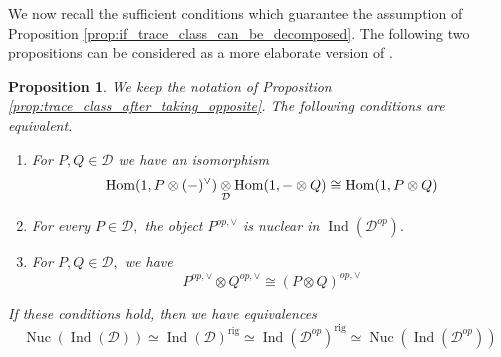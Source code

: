 \documentclass[11pt,leqno]{amsart}
\newtheorem{prop}[theo]{Proposition}
\numberwithin{equation}{section}
\def\Hom{\operatorname{Hom}}
\newcommand{\tens}[1]{%
  \mathbin{\mathop{\otimes}\displaylimits_{#1}}%
}
\newcommand{\rig}{\operatorname{rig}}
\newcommand{\Nuc}{\operatorname{Nuc}}
\newcommand{\cD}{{\mathcal D}}
\newcommand{\Ind}{\operatorname{Ind}}
\begin{document}
We now recall the sufficient conditions which guarantee the assumption of Proposition \ref{prop:if_trace_class_can_be_decomposed}. The following two propositions can be considered as a more elaborate version of \cite[Lemma 3.32]{AM24}.

\begin{prop}\label{prop:conditions_for_good_rigidification}
We keep the notation of Proposition \ref{prop:trace_class_after_taking_opposite}. The following conditions are equivalent. 
\begin{enumerate}[label=(\roman*), ref=(\roman*)]
\item For $P,Q\in\cD$ we have an isomorphism
\begin{equation}\label{eq:tensor_product_of_presheaves}
\Hom(1,P\otimes(-)^{\vee})\tens{\cD}\Hom(1,-\otimes Q)\cong \Hom(1,P\otimes Q)
\end{equation}
\label{cond_via_tensor_product_of_presheaves}
\item For every $P\in\cD,$ the object $P^{op,\vee}$ is nuclear in $\Ind(\cD^{op}).$ \label{cond_via_P^v_is_nuclear}
\item For $P,Q\in\cD,$ we have
\begin{equation*}
P^{op,\vee}\otimes Q^{op,\vee}\cong (P\otimes Q)^{op,\vee}
\end{equation*}
\label{cond_via_tensor_product_of_duals}
\end{enumerate}
If these conditions hold, then we have equivalences
\begin{equation}\label{eq:nuclear_and_rigidification}
\Nuc(\Ind(\cD))\simeq\Ind(\cD)^{\rig}\simeq \Ind(\cD^{op})^{\rig}\simeq\Nuc(\Ind(\cD^{op}))
\end{equation}
\end{prop}
\end{document}
